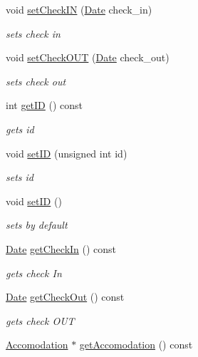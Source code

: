 \begin{DoxyCompactItemize}
void \hyperlink{class_reservation_a2751145be1295ec9c031157dddb2590b}{set\+Check\+IN} (\hyperlink{class_date}{Date} check\+\_\+in)
\begin{DoxyCompactList}\small\item\em sets check in \end{DoxyCompactList}\item 
void \hyperlink{class_reservation_a3ecb41a114fa2771f64e8a0486ab7f35}{set\+Check\+O\+UT} (\hyperlink{class_date}{Date} check\+\_\+out)
\begin{DoxyCompactList}\small\item\em sets check out \end{DoxyCompactList}\item 
int \hyperlink{class_reservation_a0d411e0681fc74669776df87fb668983}{get\+ID} () const
\begin{DoxyCompactList}\small\item\em gets id \end{DoxyCompactList}\item 
void \hyperlink{class_reservation_a81e0f9725cb37ec2abb9669691ca4440}{set\+ID} (unsigned int id)
\begin{DoxyCompactList}\small\item\em sets id \end{DoxyCompactList}\item 
\hypertarget{class_reservation_afb750e7efb165312c1b08ba7eda3eb27}{}\label{class_reservation_afb750e7efb165312c1b08ba7eda3eb27} 
void \hyperlink{class_reservation_afb750e7efb165312c1b08ba7eda3eb27}{set\+ID} ()
\begin{DoxyCompactList}\small\item\em sets by default \end{DoxyCompactList}\item 
\hyperlink{class_date}{Date} \hyperlink{class_reservation_a1a2bec76e916f0bdeedd036093cace9a}{get\+Check\+In} () const
\begin{DoxyCompactList}\small\item\em gets check In \end{DoxyCompactList}\item 
\hyperlink{class_date}{Date} \hyperlink{class_reservation_a74820e32522fcd81b643954314202513}{get\+Check\+Out} () const
\begin{DoxyCompactList}\small\item\em gets check O\+UT \end{DoxyCompactList}\item 
\hyperlink{class_accomodation}{Accomodation} $\ast$ \hyperlink{class_reservation_a752912cd2c421712758cd18e0f6335b3}{get\+Accomodation} () const

\end{DoxyCompactItemize}
